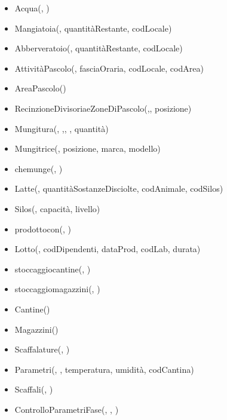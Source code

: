 \documentclass[12pt,a4paper]{article}
\begin{document}
\begin{itemize}
\item Acqua(\underline{}, \underline{})
\item Mangiatoia(\underline{}, quantitàRestante,  codLocale)
\item Abberveratoio(\underline{}, quantitàRestante,  codLocale)
\item AttivitàPascolo(\underline{}, fasciaOraria,  codLocale,  codArea)
\item AreaPascolo(\underline{})
\item RecinzioneDivisoriaeZoneDiPascolo(\underline{},\underline{}, posizione)
\item Mungitura(\underline{}, \underline{},\underline{}, \underline{}, quantità)
\item Mungitrice(\underline{}, posizione, marca, modello)
\item chemunge(\underline{}, \underline{})
\item Latte(\underline{}, quantitàSostanzeDisciolte,  codAnimale,  codSilos)
\item Silos(\underline{}, capacità, livello)
\item prodottocon(\underline{}, \underline{})
\item Lotto(\underline{}, codDipendenti, dataProd, codLab, durata)
\item stoccaggiocantine(\underline{}, \underline{})
\item stoccaggiomagazzini(\underline{}, \underline{})
\item Cantine(\underline{})
\item Magazzini(\underline{})
\item Scaffalature(\underline{}, \underline{})
\item Parametri(\underline{}, \underline{}, temperatura, umidità,  codCantina)
\item Scaffali(\underline{}, \underline{})
\item ControlloParametriFase(\underline{}, \underline{}, \underline{})

\end{itemize}
\end{document}
